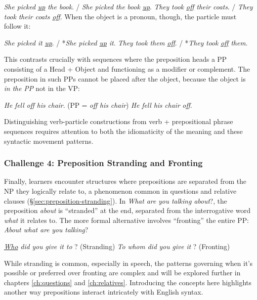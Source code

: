 \ea\label{ex:particle-movement-3}
    \ea \textit{She {\ob}picked \uline{up} the book\cb}. / \textit{She {\ob}picked the book \uline{up}\cb}.
    \ex \textit{They {\ob}took \uline{off} their coats\cb}. / \textit{They {\ob}took their coats \uline{off}\cb}.
    \z
\z
When the object is a pronoun, though, the particle must follow it:

\ea\label{ex:particle-pronoun-3}
    \ea \textit{She {\ob}picked it \uline{up}\cb}. / *\textit{She {\ob}picked \uline{up} it\cb}.
    \ex \textit{They {\ob}took them \uline{off}\cb}. / *\textit{They {\ob}took \uline{off} them\cb}.
    \z
\z

This contrasts crucially with sequences where the preposition heads a PP consisting of a Head + Object and functioning as a modifier or complement. The preposition in such PPs cannot be placed after the object, because the object is \emph{in the PP} not in the VP:

\ea\label{ex:particle-vs-pp}
    \ea \textit{He fell {\ob}off his chair\cb}. (PP = \textit{off his chair})
    \ex *\textit{He fell {\ob}his chair off\cb}.
    \z
\z

Distinguishing verb-particle constructions from verb + prepositional phrase sequences requires attention to both the idiomaticity of the meaning and these syntactic movement patterns.

\subsubsection*{Challenge 4: Preposition Stranding and Fronting}\label{sec:stranding-fronting-challenge}

Finally, learners encounter structures where prepositions are separated from the NP they logically relate to, a phenomenon common in questions and relative clauses (\S\ref{sec:preposition-stranding}). In \textit{What are you talking {\ob}about\cb}?, the preposition \textit{about} is ``stranded'' at the end, separated from the interrogative word \textit{what} it relates to. The more formal alternative involves ``fronting'' the entire PP: \textit{{\ob}About what{\cb} are you talking}?

\ea\label{ex:stranding-redux-2}
    \ea \textit{\uline{Who} did you give it {\ob}to\cb} ? (Stranding)
    \ex \textit{{\ob}To whom{\cb} did you give it} ? (Fronting)
    \z
\z

While stranding is common, especially in speech, the patterns governing when it's possible or preferred over fronting are complex and will be explored further in chapters \ref{ch:questions} and \ref{ch:relatives}. Introducing the concepts here highlights another way prepositions interact intricately with English syntax.

